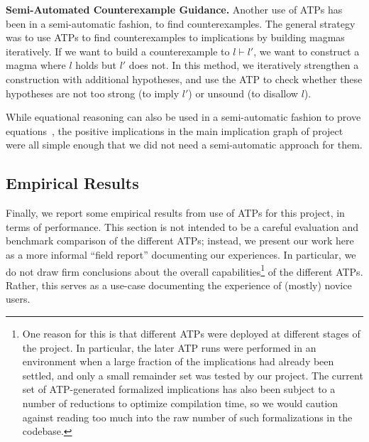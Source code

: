 \textbf{Semi-Automated Counterexample Guidance.}  Another use of ATPs has been in a semi-automatic fashion, to find counterexamples.
The general strategy was to use ATPs to find counterexamples to implications by building magmas iteratively.
If we want to build a counterexample to $l \vdash l'$, we want to construct a magma where $l$ holds but $l'$ does not.
In this method, we iteratively strengthen a construction with additional hypotheses, and use the ATP to check whether these hypotheses are not too strong (to imply $l'$) or unsound (to disallow $l$).


While equational reasoning can also be used in a semi-automatic fashion to prove equations~\cite{DBLP:journals/pacmpl/KoehlerGBGTS24}, the positive implications in the main implication graph of project were all simple enough that we did not need a semi-automatic approach for them.



\subsection{Empirical Results}

Finally, we report some empirical results from use of ATPs for this project, in terms of performance.
This section is not intended to be a careful evaluation and benchmark comparison of the different ATPs; instead, we present our work here as a more informal ``field report'' documenting our experiences.
In particular, we do not draw firm conclusions about the overall capabilities\footnote{One reason for this is that different ATPs were deployed at different stages of the project.  In particular, the later ATP runs were performed in an environment when a large fraction of the implications had already been settled, and only a small remainder set was tested by our project.  The current set of ATP-generated formalized implications has also been subject to a number of reductions to optimize compilation time, so we would caution against reading too much into the raw number of such formalizations in the codebase.} of the different ATPs.
Rather, this serves as a use-case documenting the experience of (mostly) novice users.

